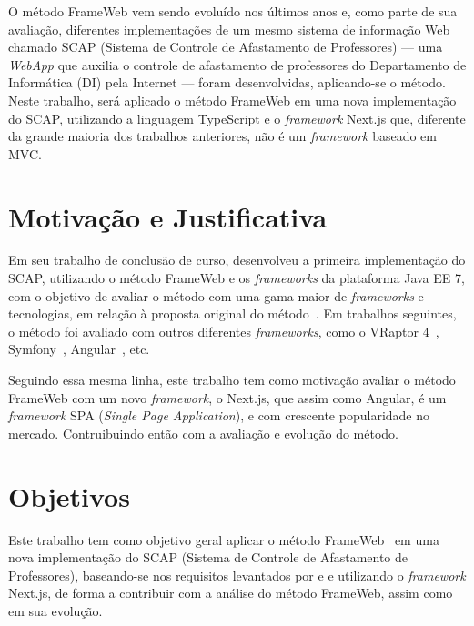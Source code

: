 O método FrameWeb vem sendo evoluído nos últimos anos e, como parte de sua avaliação, diferentes implementações de um mesmo 
sistema de informação Web chamado SCAP (Sistema de Controle de Afastamento de Professores) --- uma \textit{WebApp} que auxilia o 
controle de afastamento de professores do Departamento de Informática (DI) pela Internet --- foram desenvolvidas, aplicando-se o método. 
Neste trabalho, será aplicado o método FrameWeb em uma nova implementação do SCAP, utilizando
a linguagem TypeScript e o \textit{framework} Next.js que, diferente da grande maioria dos trabalhos anteriores, 
não é um \textit{framework} baseado em MVC.



\section{Motivação e Justificativa}
\label{sec-intro-motjus}

Em seu trabalho de conclusão de curso,  desenvolveu a primeira implementação do SCAP, utilizando o método FrameWeb e os
\textit{frameworks} da plataforma Java EE 7, com o objetivo de avaliar o método com uma gama maior de \textit{frameworks} e tecnologias,
em relação à proposta original do método~\cite{souza:2007}. Em trabalhos seguintes, o método foi
avaliado com outros diferentes \textit{frameworks}, como o VRaptor 4~\cite{prado:2015}, 
Symfony~\cite{berger:2019}, Angular~\cite{gomes:2022}, etc.

Seguindo essa mesma linha, este trabalho tem como motivação avaliar o método FrameWeb com um novo \textit{framework},
o Next.js, que assim como Angular, é um \textit{framework} SPA (\textit{Single Page Application}), e com crescente popularidade 
no mercado. Contruibuindo então com a avaliação e evolução do método.



\section{Objetivos}
\label{sec-intro-obj}

Este trabalho tem como objetivo geral aplicar o método FrameWeb~\cite{souza:2007} em uma nova implementação do SCAP (Sistema de Controle de Afastamento de Professores),
baseando-se nos requisitos levantados por  e  e utilizando o \textit{framework} Next.js, de forma a contribuir com a análise do método FrameWeb, assim como em sua evolução.

